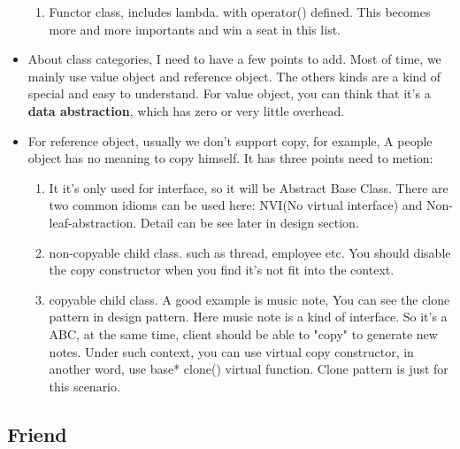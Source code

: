 \documentclass[a4paper,11pt,twoside]{book}
\begin{document}
\begin{itemize}
\begin{enumerate}
        \item Functor class, includes lambda. with operator() defined. This becomes more and more importants and win a seat in this list. 
	\end{enumerate}
    \item About class categories, I need to have a few points to add. Most of time, we mainly use value object and reference object. The others kinds are a kind of special and easy to understand. For value object, you can think that it's a \textbf{data abstraction}, which has zero or very little overhead. 
    \item For reference object, usually we don't support copy, for example, A people object has no meaning to copy himself. It has three points need to metion:
        \begin{enumerate}
            \item It it's only used for interface, so it will be Abstract Base Class. There are two common idioms can be used here: NVI(No virtual interface) and Non-leaf-abstraction. Detail can be see later in design section. 

            \item non-copyable child class. such as thread, employee etc. You should disable the copy constructor when you find it's not fit into the context.

            \item copyable child class. A good example is music note, You can see the clone pattern in design pattern. Here music note is a kind of interface. So it's a ABC, at the same time, client should be able to "copy" to generate new notes. Under such context, you can use virtual copy constructor, in another word, use base* clone() virtual function. Clone pattern is just for this scenario. 

        \end{enumerate}
\end{itemize}

\subsection{Friend}
\end{document}
